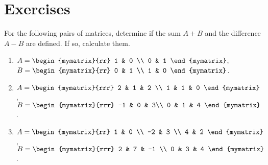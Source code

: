 \section*{Exercises}

\begin{ex}
  For the following pairs of matrices, determine if the sum $A+B$
  and the difference $A-B$ are defined. If so, calculate them.
  \begin{enumerate}
  \item
    $A = \begin{mymatrix}{rr}
      1 & 0 \\
      0 & 1
    \end{mymatrix}$,\quad
    $B = \begin{mymatrix}{rr}
      0 & 1 \\
      1 & 0
    \end{mymatrix}$.

  \item
    $A = \begin{mymatrix}{rrr}
      2 & 1 & 2 \\
      1 & 1 & 0
    \end{mymatrix}$,\quad
    $B = \begin{mymatrix}{rrr}
      -1 & 0 & 3\\
      0 & 1 & 4
    \end{mymatrix}$.

  \item
    $A = \begin{mymatrix}{rr}
      1 & 0 \\
      -2 & 3 \\
      4 & 2
    \end{mymatrix}$,\quad
    $B = \begin{mymatrix}{rrr}
      2 & 7 & -1 \\
      0 & 3 & 4
    \end{mymatrix}$.
  \end{enumerate}
\end{ex}

